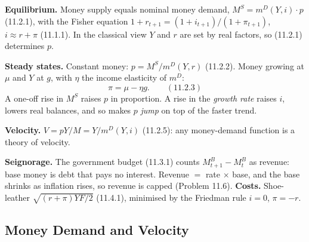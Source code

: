 \documentclass[12pt, letterpaper]{article}
\newcommand{\mD}{m^{D}}
\newcommand{\Ms}{M^{S}}
\newcommand{\MBase}{M^{B}}
\begin{document}
\begin{tcolorbox}[theorybox,title={Chapter 11 Overview}]
\textbf{Equilibrium.} Money supply equals nominal money demand,
$\Ms=\mD(Y,i)\cdot p$ (11.2.1), with the Fisher equation $1+r_{t+1}=(1+i_{t+1})/(1+\pi_{t+1})$,
$i\approx r+\pi$ (11.1.1). In the classical view $Y$ and $r$ are set by real factors, so
(11.2.1) determines $p$.

\smallskip
\textbf{Steady states.} Constant money: $p=\Ms/\mD(Y,r)$ (11.2.2). Money growing at $\mu$
and $Y$ at $g$, with $\eta$ the income elasticity of $\mD$:
\[
\pi=\mu-\eta g .\qquad(11.2.3)
\]
A one-off rise in $\Ms$ raises $p$ in proportion. A rise in the \emph{growth rate} raises $i$,
lowers real balances, and so makes $p$ \emph{jump} on top of the faster trend.

\smallskip
\textbf{Velocity.} $V=pY/M=Y/\mD(Y,i)$ (11.2.5): any money-demand function is a theory of
velocity.

\smallskip
\textbf{Seignorage.} The government budget (11.3.1) counts $\MBase_{t+1}-\MBase_t$ as revenue:
base money is debt that pays no interest. Revenue $=$ rate $\times$ base, and the base shrinks
as inflation rises, so revenue is capped (Problem 11.6). \textbf{Costs.} Shoe-leather
$\sqrt{(r+\pi)YF/2}$ (11.4.1), minimised by the Friedman rule $i=0$, $\pi=-r$.
\end{tcolorbox}

\subsection{Money Demand and Velocity}
\end{document}
